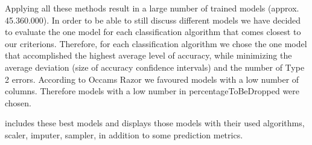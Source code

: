 Applying all these methods result in a large number of trained models (approx. 45.360.000). In order to be able to still discuss different models we have decided to evaluate the one model for each classification algorithm that comes closest to our criterions. Therefore, for each classification algorithm we chose the one model that accomplished the highest average level of accuracy, while minimizing the average deviation (size of accuracy confidence intervals) and the number of Type 2 errors. According to Occams Razor we favoured models with a low number of columns. Therefore models with a low number in percentageToBeDropped were chosen.

 includes these best models and displays those models with their used algorithms, scaler, imputer, sampler, in addition to some prediction metrics.  



